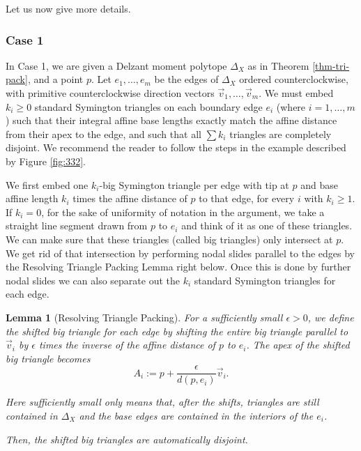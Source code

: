 \documentclass[11pt, reqno]{amsart}
\newtheorem{lemma}[theorem]{Lemma}
\theoremstyle{definition}
\begin{document}
Let us now give more details.
\subsubsection{Case 1}
\label{sec:case1}

In Case 1, we are given a Delzant moment polytope $\Delta_X$ as in Theorem \ref{thm-tri-pack}, and a point $p$. Let $e_1, \dots, e_m$ be the edges of $\Delta_X$ ordered counterclockwise, with primitive counterclockwise direction vectors $\vec{v}_1, \dots, \vec{v}_m$. We must embed $k_i \ge 0$ standard Symington triangles on each boundary edge $e_i$ (where $i=1,\dots,m$) such that their integral affine base lengths exactly match the affine distance from their apex to the edge, and such that all $\sum k_i$ triangles are completely disjoint. We recommend the reader to follow the steps in the example described by Figure \ref{fig:332}.

We first embed one $k_i$-big Symington triangle per edge with tip at $p$ and base affine length $k_i$ times the affine distance of $p$ to that edge, for every $i$ with $k_i\geq 1$. If $k_i=0$, for the sake of uniformity of notation in the argument, we take a straight line segment drawn from $p$ to $e_i$ and think of it as one of these triangles. We can make sure that these triangles (called big triangles) only intersect at $p$. We get rid of that intersection by performing nodal slides parallel to the edges by the Resolving Triangle Packing Lemma right below. Once this is done by further nodal slides we can also separate out the $k_i$ standard Symington triangles for each edge.


\begin{lemma}[Resolving Triangle Packing]
For a sufficiently small $\epsilon > 0$, we define the shifted big triangle for each edge by shifting the entire big triangle parallel to $\vec{v}_i$ by $\epsilon$ times the inverse of the affine distance of $p$ to $e_i$. The apex of the shifted big triangle becomes
\begin{equation}
    A_i := p + \frac{\epsilon}{d(p, e_i)} \vec{v}_i.
\end{equation} 

Here sufficiently small only means that, after the shifts, triangles are still contained in $\Delta_X$ and the base edges are contained in the interiors of the $e_i$. 

Then, the shifted big triangles are automatically disjoint.
\end{lemma}
\end{document}
